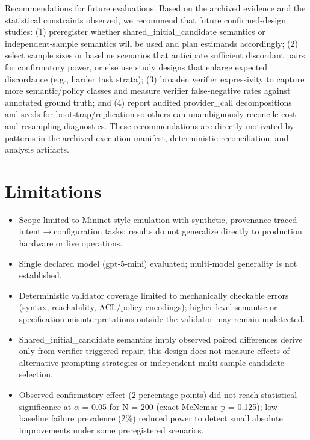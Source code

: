 \documentclass[conference]{IEEEtran}
\begin{document}
Recommendations for future evaluations. Based on the archived evidence and the statistical constraints observed, we recommend that future confirmed‑design studies: (1) preregister whether shared\_initial\_candidate semantics or independent‑sample semantics will be used and plan estimands accordingly; (2) select sample sizes or baseline scenarios that anticipate sufficient discordant pairs for confirmatory power, or else use study designs that enlarge expected discordance (e.g., harder task strata); (3) broaden verifier expressivity to capture more semantic/policy classes and measure verifier false‑negative rates against annotated ground truth; and (4) report audited provider\_call decompositions and seeds for bootstrap/replication so others can unambiguously reconcile cost and resampling diagnostics. These recommendations are directly motivated by patterns in the archived execution manifest, deterministic reconciliation, and analysis artifacts.

\section{Limitations}
\begin{itemize}
\item Scope limited to Mininet‑style emulation with synthetic, provenance‑traced intent\ensuremath{\rightarrow}configuration tasks; results do not generalize directly to production hardware or live operations.
\item Single declared model (gpt‑5‑mini) evaluated; multi‑model generality is not established.
\item Deterministic validator coverage limited to mechanically checkable errors (syntax, reachability, ACL/policy encodings); higher‑level semantic or specification misinterpretations outside the validator may remain undetected.
\item Shared\_initial\_candidate semantics imply observed paired differences derive only from verifier‑triggered repair; this design does not measure effects of alternative prompting strategies or independent multi‑sample candidate selection.
\item Observed confirmatory effect (2 percentage points) did not reach statistical significance at \ensuremath{\alpha} = 0.05 for N = 200 (exact McNemar p = 0.125); low baseline failure prevalence (2\%) reduced power to detect small absolute improvements under some preregistered scenarios.
\end{itemize}
\end{document}
